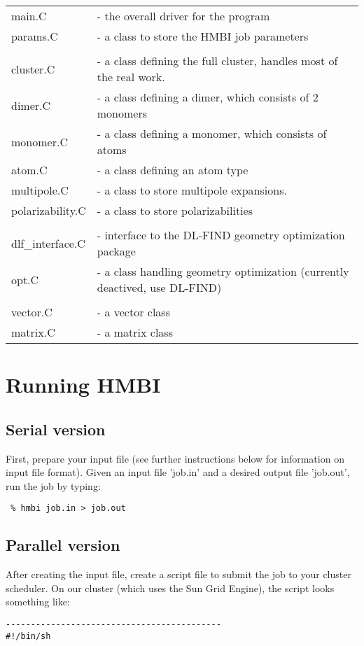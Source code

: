 \documentclass[11pt,letterpaper]{article}
\begin{document}
\begin{spacing}{1.0}
\begin{tabular}{ll}
main.C		&- the overall driver for the program \\
params.C	&- a class to store the HMBI job parameters \\
\\
cluster.C	&- a class defining the full cluster, handles most of the real work. \\
dimer.C		&- a class defining a dimer, which consists of 2 monomers \\
monomer.C	&- a class defining a monomer, which consists of atoms \\
atom.C		&- a class defining an atom type \\
multipole.C     &- a class to store multipole expansions. \\
polarizability.C &- a class to store polarizabilities \\
\\
dlf\_interface.C &- interface to the DL-FIND geometry optimization package \\
opt.C		&- a class handling geometry optimization (currently deactived, use DL-FIND)\\
\\
vector.C	&- a vector class \\
matrix.C        &- a matrix class \\
\end{tabular}

\section{Running HMBI}

\subsection{Serial version}

First, prepare your input file (see further instructions below for information
on input file format).  Given an input file 'job.in' and a desired output file
'job.out', run the job by typing:
\begin{verbatim}
 % hmbi job.in > job.out
\end{verbatim}

\subsection{Parallel version}

After creating the input file, create a script file to submit the job
to your cluster scheduler.  On our cluster (which uses the Sun Grid
Engine), the script looks something like:
\begin{verbatim}
-------------------------------------------
#!/bin/sh


\end{verbatim}
\end{spacing}
\end{document}

